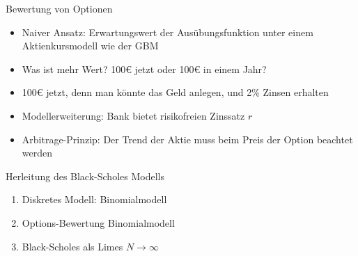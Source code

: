 \documentclass{beamer}
\begin{document}
\begin{frame}{Bewertung von Optionen}
  \begin{itemize}
      \item Naiver Ansatz: Erwartungswert der Ausübungsfunktion unter einem Aktienkursmodell wie der GBM
      \pause
      \item Was ist mehr Wert? 100€ jetzt oder 100€ in einem Jahr?
      \pause
      \item 100€ jetzt, denn man könnte das Geld anlegen, und 2\% Zinsen erhalten
      \item Modellerweiterung: Bank bietet risikofreien Zinssatz $r$
      \pause
      \item Arbitrage-Prinzip: Der Trend der Aktie muss beim Preis der Option beachtet werden 
  \end{itemize}
\end{frame}

\begin{frame}{Herleitung des Black-Scholes Modells}
  \begin{enumerate}
      \item Diskretes Modell: Binomialmodell
      \item Options-Bewertung Binomialmodell
      \item Black-Scholes als Limes $N \to \infty$
  \end{enumerate}
\end{frame}
\end{document}
